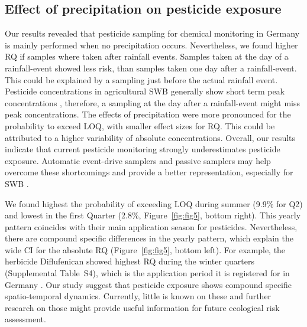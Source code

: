 \documentclass[journal=esthag,manuscript=article]{achemso}
\begin{document}
\subsection{Effect of precipitation on pesticide exposure}
Our results revealed that pesticide sampling for chemical monitoring in Germany is mainly performed when no precipitation occurs. 
Nevertheless, we found higher RQ if samples where taken after rainfall events. 
Samples taken at the day of a rainfall-event showed less risk, than samples taken one day after a rainfall-event.
This could be explained by a sampling just before the actual rainfall event.
Pesticide concentrations in agricultural SWB generally show short term peak concentrations \citep{wittmer_significance_2010}, therefore, a sampling at the day after a rainfall-event might miss peak concentrations.
The effects of precipitation were more pronounced for the probability to exceed LOQ, with smaller effect sizes for RQ.
This could be attributed to a higher variability of absolute concentrations.
Overall, our results indicate that current pesticide monitoring strongly underestimates pesticide exposure.
Automatic event-drive samplers \citep{stehle_probabilistic_2013} and passive samplers \citep{fernandez_calibration_2014,moschet_evaluation_2015} may help overcome these shortcomings and provide a better representation, especially for SWB \citep{lorenz_specifics_2016}. 

We found highest the probability of exceeding LOQ during summer (9.9\% for Q2) and lowest in the first Quarter (2.8\%, Figure~\ref{fig:fig5}, bottom right).
This yearly pattern coincides with their main application season for pesticides.
Nevertheless, there are compound specific differences in the yearly pattern, which explain the wide CI for the absolute RQ (Figure~\ref{fig:fig5}, bottom left).
For example, the herbicide Diflufenican showed highest RQ during the winter quarters (Supplemental Table~S4), which is the application period it is registered for in Germany \citep{bvl_online_2016}.
Our study suggest that pesticide exposure shows compound specific spatio-temporal dynamics.
Currently, little is known on these and further research on those might provide useful information for future ecological risk assessment. 
\end{document}
